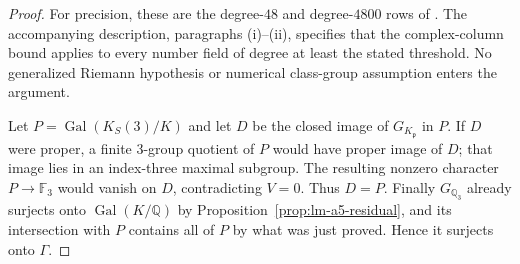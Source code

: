 \begin{proof}
For precision, these are the degree-$48$ and degree-$4800$ rows
of \citet[Table~2]{Odlyzko1976}. The accompanying description,
paragraphs (i)--(ii), specifies that the complex-column
bound applies to every number field of degree at least
the stated threshold.  No generalized Riemann hypothesis
or numerical class-group assumption enters the argument.

Let $P=\operatorname{Gal}(K_S(3)/K)$ and let $D$ be the
closed image of $G_{K_{\mathfrak p}}$ in $P$.
If $D$ were proper, a finite $3$-group quotient of $P$
would have proper image of $D$; that image lies in an
index-three maximal subgroup.  The resulting nonzero
character $P\to\mathbb F_3$ would vanish on $D$,
contradicting $V=0$.  Thus $D=P$.
Finally $G_{\mathbb Q_3}$ already surjects onto
$\operatorname{Gal}(K/\mathbb Q)$ by
Proposition~\ref{prop:lm-a5-residual}, and its intersection
with $P$ contains all of $P$ by what was just proved.
Hence it surjects onto $\Gamma$.
\end{proof}

